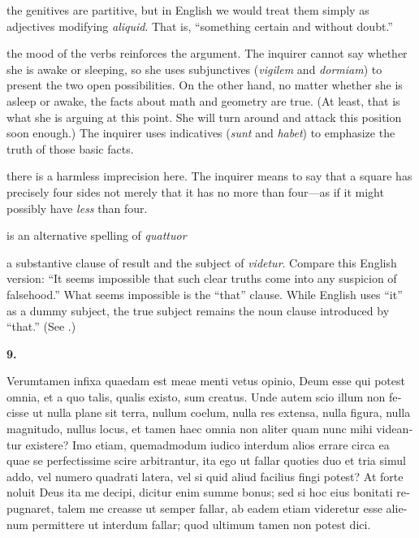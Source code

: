  the genitives are partitive, but in English we would treat them simply as adjectives modifying \textit{aliquid}. That is, ``something certain and without doubt.''

 the mood of the verbs reinforces the argument. The inquirer cannot say whether she is awake or sleeping, so she uses subjunctives (\textit{vigilem} and \textit{dormiam}) to present the two open possibilities. On the other hand, no matter whether she is asleep or awake, the facts about math and geometry are true. (At least, that is what she is arguing at this point. She will turn around and attack this position soon enough.) The inquirer uses indicatives (\textit{sunt} and \textit{habet}) to emphasize the truth of those basic facts.

 there is a harmless imprecision here. The inquirer means to say that a square has precisely four sides not merely that it has no more than four---as if it might possibly have \textit{less} than four.

 is an alternative spelling of \textit{quattuor}

 a substantive clause of result and the subject of \textit{videtur}. Compare this English version: ``It seems impossible that such clear truths come into any suspicion of falsehood.'' What seems impossible is the ``that'' clause. While English uses ``it'' as a dummy subject, the true subject remains the noun clause introduced by ``that.'' (See \cite[218]{huddleston2005}.)

\clearpage

\beginnumbering
\pstart
\textbf{9.} \begin{latin}Verumtamen infixa quaedam est meae menti vetus opinio, Deum esse qui potest omnia, et a quo talis, qualis existo, sum creatus. Unde autem scio illum non fecisse ut nulla plane sit terra, nullum coelum, nulla res extensa, nulla figura, nulla magnitudo, nullus locus, et tamen haec omnia non aliter quam nunc mihi videantur existere? Imo etiam, quemadmodum iudico interdum alios errare circa ea quae se perfectissime scire arbitrantur, ita ego ut fallar quoties duo et tria simul addo, vel numero quadrati latera, vel si quid aliud facilius fingi potest? At forte noluit Deus ita me decipi, dicitur enim summe bonus; sed si hoc eius bonitati repugnaret, talem me creasse ut semper fallar, ab eadem etiam videretur esse alienum permittere ut interdum fallar; quod ultimum tamen non potest dici.\end{latin}
\pend
\endnumbering

